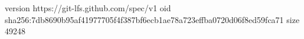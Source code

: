version https://git-lfs.github.com/spec/v1
oid sha256:7db8690b95af41977705f4f387bf6ecb1ae78a723effba0720d06f8ed59fca71
size 49248
